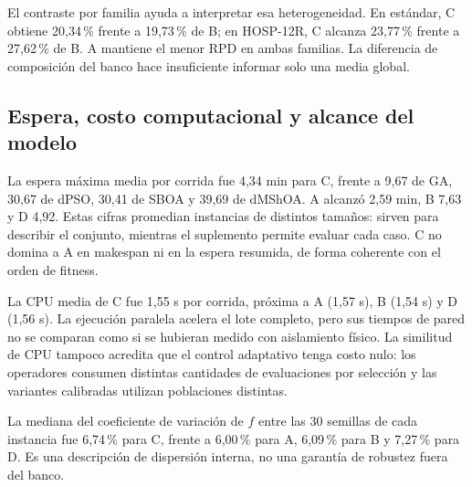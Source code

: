 \documentclass[11pt,a4paper]{article}
\begin{document}
\begin{center}
\label{fig:familias}
\end{center}
El contraste por familia ayuda a interpretar esa heterogeneidad. En estándar, C obtiene 20,34\,\% frente a 19,73\,\% de B; en HOSP-12R, C alcanza 23,77\,\% frente a 27,62\,\% de B. A mantiene el menor RPD en ambas familias. La diferencia de composición del banco hace insuficiente informar solo una media global.

\newpage
\subsection{Espera, costo computacional y alcance del modelo}
La espera máxima media por corrida fue 4,34 min para C, frente a 9,67 de GA, 30,67 de dPSO, 30,41 de SBOA y 39,69 de dMShOA. A alcanzó 2,59 min, B 7,63 y D 4,92. Estas cifras promedian instancias de distintos tamaños: sirven para describir el conjunto, mientras el suplemento permite evaluar cada caso. C no domina a A en makespan ni en la espera resumida, de forma coherente con el orden de fitness.

La CPU media de C fue 1,55 s por corrida, próxima a A (1,57 s), B (1,54 s) y D (1,56 s). La ejecución paralela acelera el lote completo, pero sus tiempos de pared no se comparan como si se hubieran medido con aislamiento físico. La similitud de CPU tampoco acredita que el control adaptativo tenga costo nulo: los operadores consumen distintas cantidades de evaluaciones por selección y las variantes calibradas utilizan poblaciones distintas.

La mediana del coeficiente de variación de $f$ entre las 30 semillas de cada instancia fue 6,74\,\% para C, frente a 6,00\,\% para A, 6,09\,\% para B y 7,27\,\% para D. Es una descripción de dispersión interna, no una garantía de robustez fuera del banco.
\end{document}
